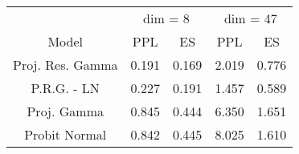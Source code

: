 
\begin{tabular}{ccccc}
\toprule
\multicolumn{1}{c}{ } & \multicolumn{2}{c}{dim = 8} & \multicolumn{2}{c}{dim = 47} \\
\cmidrule(l{3pt}r{3pt}){2-3} \cmidrule(l{3pt}r{3pt}){4-5}
Model & PPL & ES & PPL & ES\\
\midrule
Proj. Res. Gamma & 0.191 & 0.169 & 2.019 & 0.776\\
P.R.G. - LN & 0.227 & 0.191 & 1.457 & 0.589\\
Proj. Gamma & 0.845 & 0.444 & 6.350 & 1.651\\
Probit Normal & 0.842 & 0.445 & 8.025 & 1.610\\
\bottomrule
\end{tabular}